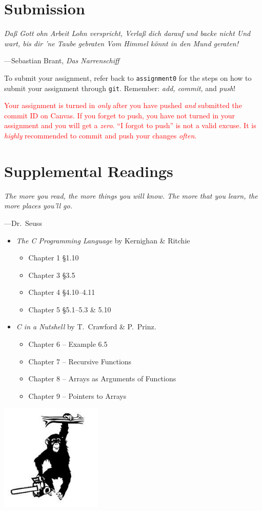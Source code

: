\documentclass[11pt]{article}
\begin{document}
\section{Submission}

\epigraph{\emph{Da\ss{} Gott ohn Arbeit Lohn verspricht, Verla\ss{} dich
darauf und backe nicht Und wart, bis dir 'ne Taube gebraten Vom Himmel
k\"onnt in den Mund geraten!}}{---Sebastian Brant, \emph{Das
Narrenschiff}}

To submit your assignment, refer back to \texttt{assignment0} for the
steps on how to submit your assignment through \texttt{git}.  Remember:
\emph{add, commit,} and \emph{push}!

\textcolor{red}{Your assignment is turned in \emph{only} after you have
  pushed \emph{and} submitted the commit ID on Canvas. If you forget to
  push, you have not turned in your assignment and you will get a
  \emph{zero}. ``I forgot to push'' is not a valid excuse. It is
\emph{highly} recommended to commit and push your changes \emph{often}.}


\section{Supplemental Readings}

\epigraph{\emph{The more you read, the more things you will know. The more that
you learn, the more places you'll go.}}{---Dr.\ Seuss}\noindent

\begin{itemize}
    \item \textit{The C Programming Language} by Kernighan \& Ritchie
    \begin{itemize}
	\item Chapter 1 \S 1.10
	\item Chapter 3 \S 3.5
        \item Chapter 4 \S 4.10--4.11
        \item Chapter 5 \S 5.1--5.3 \& 5.10
    \end{itemize}
     \item  \emph{C in a Nutshell} by T.\ Crawford \& P.\ Prinz.
     \begin{itemize}
      \item Chapter 6 -- Example 6.5		%
      \item Chapter 7 -- Recursive Functions
      \item Chapter 8 -- Arrays as Arguments of Functions
      \item Chapter 9 -- Pointers to Arrays
      \end{itemize}
\end{itemize}
\centerline{\includegraphics[height=2in]{monkey.jpeg}}
\end{document}

